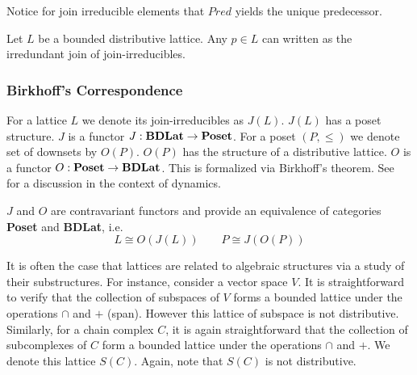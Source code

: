  Notice for join irreducible elements that $Pred$ yields the unique predecessor.

\begin{lem}\label{lem:join}
Let $L$ be a bounded distributive lattice.  Any $p\in L$ can written as the irredundant join of join-irreducibles.
\end{lem}


\subsubsection{Birkhoff's Correspondence}

For a lattice $L$ we denote its join-irreducibles as $J(L)$.  $J(L)$ has a poset structure.  $J$ is a functor $J:{\bf BDLat}\to {\bf Poset}$.  For a poset $(P,\leq)$ we denote set of downsets by $O(P)$. $O(P)$ has the structure of a distributive lattice.  $O$ is a functor $O:{\bf Poset}\to {\bf BDLat}$.  This is formalized via Birkhoff's theorem.  See~\cite{lsa,lsa2,salamon} for a discussion in the context of dynamics.

\begin{thm}\label{thm:birkhoff}
$J$ and $O$ are contravariant functors and provide an equivalence of categories {\bf Poset} and {\bf BDLat}, i.e. $$L\cong O(J(L))\quad\quad P\cong J(O(P))$$

\end{thm}

It is often the case that lattices are related to algebraic structures via a study of their substructures.  For instance, consider a vector space $V$.  It is straightforward to verify that the collection of subspaces of $V$ forms a bounded lattice under the operations $\cap$ and $+$ (span). However this lattice of subspace is not distributive.  Similarly, for a chain complex $C$, it is again straightforward that the collection of subcomplexes of $C$ form a bounded lattice under the operations $\cap$ and $+$.  We denote this lattice $S(C)$.  Again, note that $S(C)$ is not distributive.









